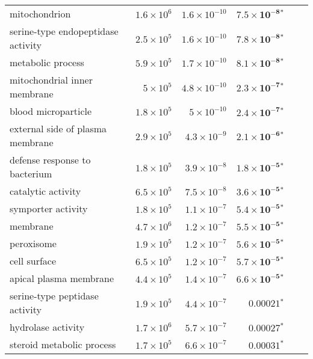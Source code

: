 \begin{longtable}{|l|r|r|r|r|r|}
    mitochondrion                            & $1.6\times 10^{6}$ & $1.6\times 10^{-10}$ & $\bm{7.5\times 10^{-8}{^*}}$    \\
    serine-type endopeptidase activity       & $2.5\times 10^{5}$ & $1.6\times 10^{-10}$ & $\bm{7.8\times 10^{-8}{^*}}$    \\
    metabolic process                        & $5.9\times 10^{5}$ & $1.7\times 10^{-10}$ & $\bm{8.1\times 10^{-8}{^*}}$    \\
    mitochondrial inner membrane             & $ 5\times 10^{5}$  & $4.8\times 10^{-10}$ & $\bm{2.3\times 10^{-7}{^*}}$    \\
    blood microparticle                      & $1.8\times 10^{5}$ & $ 5\times 10^{-10}$  & $\bm{2.4\times 10^{-7}{^*}}$    \\
    external side of plasma membrane         & $2.9\times 10^{5}$ & $4.3\times 10^{-9}$  & $\bm{2.1\times 10^{-6}{^*}}$    \\
    defense response to bacterium            & $1.8\times 10^{5}$ & $3.9\times 10^{-8}$  & $\bm{1.8\times 10^{-5}{^*}}$    \\
    catalytic activity                       & $6.5\times 10^{5}$ & $7.5\times 10^{-8}$  & $\bm{3.6\times 10^{-5}{^*}}$    \\
    symporter activity                       & $1.8\times 10^{5}$ & $1.1\times 10^{-7}$  & $\bm{5.4\times 10^{-5}{^*}}$    \\
    membrane                                 & $4.7\times 10^{6}$ & $1.2\times 10^{-7}$  & $\bm{5.5\times 10^{-5}{^*}}$    \\
    peroxisome                               & $1.9\times 10^{5}$ & $1.2\times 10^{-7}$  & $\bm{5.6\times 10^{-5}{^*}}$    \\
    cell surface                             & $6.5\times 10^{5}$ & $1.2\times 10^{-7}$  & $\bm{5.7\times 10^{-5}{^*}}$    \\
    apical plasma membrane                   & $4.4\times 10^{5}$ & $1.4\times 10^{-7}$  & $\bm{6.6\times 10^{-5}{^*}}$    \\
    serine-type peptidase activity           & $1.9\times 10^{5}$ & $4.4\times 10^{-7}$  & $\bm{0.00021{^*}}$              \\
    hydrolase activity                       & $1.7\times 10^{6}$ & $5.7\times 10^{-7}$  & $\bm{0.00027{^*}}$              \\
    steroid metabolic process                & $1.7\times 10^{5}$ & $6.6\times 10^{-7}$  & $\bm{0.00031{^*}}$              \\

\end{longtable}
